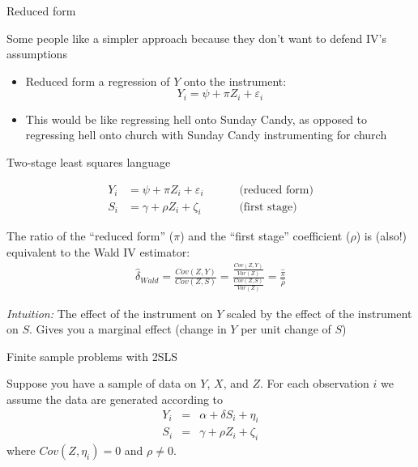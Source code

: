 \documentclass{beamer}
\begin{document}
\begin{frame}{Reduced form}

  Some people like a simpler approach because they don't want to defend IV's assumptions
  \begin{itemize}
    \item Reduced form a regression of $Y$ onto the instrument:
          $$Y_i = \psi + \pi{Z_i} + \varepsilon_i$$

    \item This would be like regressing hell onto Sunday Candy, as opposed to regressing hell onto church with Sunday Candy instrumenting for church
  \end{itemize}
\end{frame}



\begin{frame}{Two-stage least squares language}

  \vspace*{-7mm}
  \begin{eqnarray*}
    Y_i &= \psi + \pi{Z_i} + \varepsilon_i \quad\quad&\text{ (reduced form)} \\
    S_i &= \gamma + \rho{Z}_i + \zeta_i    \quad\quad&\text{ (first stage)}
  \end{eqnarray*}

  \bigskip
  The ratio of the ``reduced form'' ($\pi$) and the ``first stage'' coefficient ($\rho$) is (also!) equivalent to the Wald IV estimator:
  \begin{eqnarray*}
    \widehat{\delta}_{Wald} = \frac{ Cov(Z,Y)} {Cov(Z,S)} = \frac{ \frac{Cov(Z,Y)}{Var(Z)}}{ \frac{Cov(Z,S)}{Var(Z)}} = \frac{\widehat{\pi}}{\widehat{\rho}}
  \end{eqnarray*}

  \bigskip\pause
  \emph{Intuition:} The effect of the instrument on $Y$ scaled by the effect of the instrument on $S$. Gives you a marginal effect (change in $Y$ per unit change of $S$)
\end{frame}




\begin{frame}{Finite sample problems with 2SLS}

  Suppose you have a sample of data on $Y$, $X$, and $Z$. For each observation $i$ we assume the data are generated according to
  \begin{eqnarray*}
    Y_i &=& \alpha + \delta{S}_i + \eta_i \\
    S_i &=& \gamma + \rho{Z}_i + \zeta_i
  \end{eqnarray*}where $Cov(Z,\eta_i)=0$ and $\rho\neq{0}$.

\end{frame}
\end{document}
